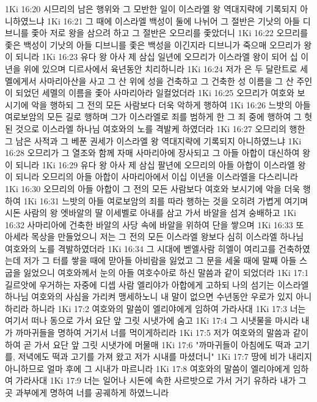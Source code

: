 1Ki 16:20  시므리의 남은 행위와 그 모반한 일이 이스라엘 왕 역대지략에 기록되지 아니하였느냐
1Ki 16:21  그 때에 이스라엘 백성이 둘에 나뉘어 그 절반은 기낫의 아들 디브니를 좇아 저로 왕을 삼으려 하고 그 절반은 오므리를 좇았더니
1Ki 16:22  오므리를 좇은 백성이 기낫의 아들 디브니를 좇은 백성을 이긴지라 디브니가 죽으매 오므리가 왕이 되니라
1Ki 16:23  유다 왕 아사 제 삼십 일년에 오므리가 이스라엘 왕이 되어 십 이년을 위에 있으며 디르사에서 육년동안 치리하니라
1Ki 16:24  저가 은 두 달란트로 세멜에게서 사마리아산을 사고 그 산 위에 성을 건축하고 그 건축한 성 이름을 그 산 주인이 되었던 세멜의 이름을 좇아 사마리아라 일컬었더라
1Ki 16:25  오므리가 여호와 보시기에 악을 행하되 그 전의 모든 사람보다 더욱 악하게 행하여
1Ki 16:26  느밧의 아들 여로보암의 모든 길로 행하며 그가 이스라엘로 죄를 범하게 한 그 죄 중에 행하여 그 헛된 것으로 이스라엘 하나님 여호와의 노를 격발케 하였더라
1Ki 16:27  오므리의 행한 그 남은 사적과 그 베푼 권세가 이스라엘 왕 역대지략에 기록되지 아니하였느냐
1Ki 16:28  오므리가 그 열조와 함께 자매 사마리아에 장사되고 그 아들 아합이 대신하여 왕이 되니라
1Ki 16:29  유다 왕 아사 제 삼십 팔년에 오므리의 아들 아합이 이스라엘 왕이 되니라 오므리의 아들 아합이 사마리아에서 이십 이년을 이스라엘을 다스리니라
1Ki 16:30  오므리의 아들 아합이 그 전의 모든 사람보다 여호와 보시기에 악을 더욱 행하여
1Ki 16:31  느밧의 아들 여로보암의 죄를 따라 행하는 것을 오히려 가볍게 여기며 시돈 사람의 왕 엣바알의 딸 이세벨로 아내를 삼고 가서 바알을 섬겨 숭배하고
1Ki 16:32  사마리아에 건축한 바알의 사당 속에 바알을 위하여 단을 쌓으며
1Ki 16:33  또 아세라 목상을 만들었으니 저는 그 전의 모든 이스라엘 왕보다 심히 이스라엘 하나님 여호와의 노를 격발하였더라
1Ki 16:34  그 시대에 벧엘사람 히엘이 여리고를 건축하였는데 저가 그 터를 쌓을 때에 맏아들 아비람을 잃었고 그 문을 세울 때에 말째 아들 스굽을 잃었으니 여호와께서 눈의 아들 여호수아로 하신 말씀과 같이 되었더라
1Ki 17:1  길르앗에 우거하는 자중에 디셉 사람 엘리야가 아합에게 고하되 나의 섬기는 이스라엘 하나님 여호와의 사심을 가리켜 맹세하노니 내 말이 없으면 수년동안 우로가 있지 아니하리라 하니라
1Ki 17:2  여호와의 말씀이 엘리야에게 임하여 가라사대
1Ki 17:3  너는 여기서 떠나 동으로 가서 요단 앞 그릿 시냇가에 숨고
1Ki 17:4  그 시냇물을 마시라 내가 까마귀들을 명하여 거기서 너를 먹이게하리라
1Ki 17:5  저가 여호와의 말씀과 같이 하여 곧 가서 요단 앞 그릿 시냇가에 머물매
1Ki 17:6  "까마귀들이 아침에도 떡과 고기를, 저녁에도 떡과 고기를 가져 왔고 저가 시내를 마셨더니"
1Ki 17:7  땅에 비가 내리지 아니하므로 얼마 후에 그 시내가 마르니라
1Ki 17:8  여호와의 말씀이 엘리야에게 임하여 가라사대
1Ki 17:9  너는 일어나 시돈에 속한 사르밧으로 가서 거기 유하라 내가 그 곳 과부에게 명하여 너를 공궤하게 하였느니라
